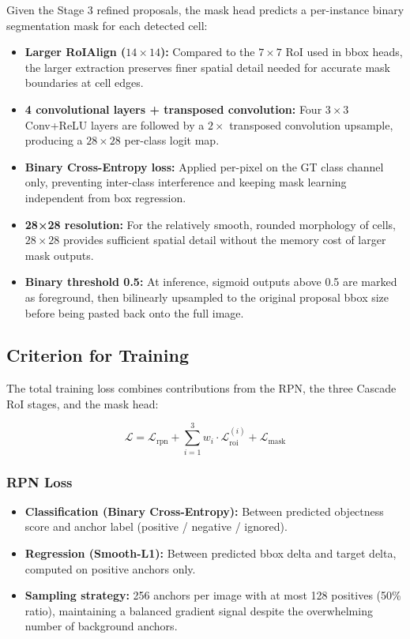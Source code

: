 \documentclass[a4paper]{article} %
\begin{document}
Given the Stage 3 refined proposals, the mask head predicts a per-instance binary segmentation mask for each detected cell:
\begin{itemize}
    \item \textbf{Larger RoIAlign ($14\times14$):} Compared to the $7\times7$ RoI used in bbox heads, the larger extraction preserves finer spatial detail needed for accurate mask boundaries at cell edges.
    \item \textbf{4 convolutional layers + transposed convolution:} Four $3\times3$ Conv+ReLU layers are followed by a $2\times$ transposed convolution upsample, producing a $28\times28$ per-class logit map.
    \item \textbf{Binary Cross-Entropy loss:} Applied per-pixel on the GT class channel only, preventing inter-class interference and keeping mask learning independent from box regression.
    \item \textbf{28×28 resolution:} For the relatively smooth, rounded morphology of cells, $28\times28$ provides sufficient spatial detail without the memory cost of larger mask outputs.
    \item \textbf{Binary threshold 0.5:} At inference, sigmoid outputs above 0.5 are marked as foreground, then bilinearly upsampled to the original proposal bbox size before being pasted back onto the full image.
\end{itemize}

\subsection{Criterion for Training}

The total training loss combines contributions from the RPN, the three Cascade RoI stages, and the mask head:

\[\mathcal{L} = \mathcal{L}_{\mathrm{rpn}} + \sum_{i=1}^{3} w_i \cdot \mathcal{L}_{\mathrm{roi}}^{(i)} + \mathcal{L}_{\mathrm{mask}}\]

\subsubsection{RPN Loss}

\begin{itemize}
    \item \textbf{Classification (Binary Cross-Entropy):} Between predicted objectness score and anchor label (positive / negative / ignored).
    \item \textbf{Regression (Smooth-L1):} Between predicted bbox delta and target delta, computed on positive anchors only.
    \item \textbf{Sampling strategy:} 256 anchors per image with at most 128 positives (50\% ratio), maintaining a balanced gradient signal despite the overwhelming number of background anchors.
\end{itemize}
\end{document}
